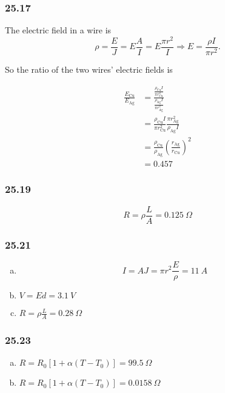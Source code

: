 \documentclass{article}
\begin{document}
\subsubsection{25.17}

The electric field in a wire is \[\rho = \frac{E}{J} = E \frac{A}{I} = E \frac{\pi r^2}{I} \Rightarrow E = \frac{\rho I}{\pi r^2}.\]

So the ratio of the two wires' electric fields is

\begin{align*}
  \frac{E_\textrm{Cu}}{E_\textrm{Ag}} & = \frac{\frac{\rho_\textrm{Cu} I}{\pi r_\textrm{Cu}^2}}{\frac{\rho_\textrm{Ag} I}{\pi r_\textrm{Ag}^2}} \\
                                      & = \frac{\rho_\textrm{Cu} I}{\pi r_\textrm{Cu}^2} \frac{\pi r_\textrm{Ag}^2}{\rho_\textrm{Ag} I}         \\
                                      & = \frac{\rho_\textrm{Cu}}{\rho_\textrm{Ag}} \left( \frac{r_\textrm{Ag}}{r_\textrm{Cu}} \right)^2        \\
                                      & = 0.457
\end{align*}

\subsubsection{25.19}

\[R = \rho \frac{L}{A} = \qty{0.125}{\Omega}\]

\subsubsection{25.21}

\begin{enumerate}[(a)]
  \item \[I = A J = \pi r^2 \frac{E}{\rho} = \qty{11}{A}\]

  \item $V = E d = \qty{3.1}{V}$

  \item $R = \rho \frac{L}{A} = \qty{0.28}{\Omega}$
\end{enumerate}

\subsubsection{25.23}

\begin{enumerate}[(a)]
  \item $R = R_0 [1 + \alpha (T - T_0)] = \qty{99.5}{\Omega}$

  \item $R = R_0 [1 + \alpha (T - T_0)] = \qty{0.0158}{\Omega}$
\end{enumerate}
\end{document}
